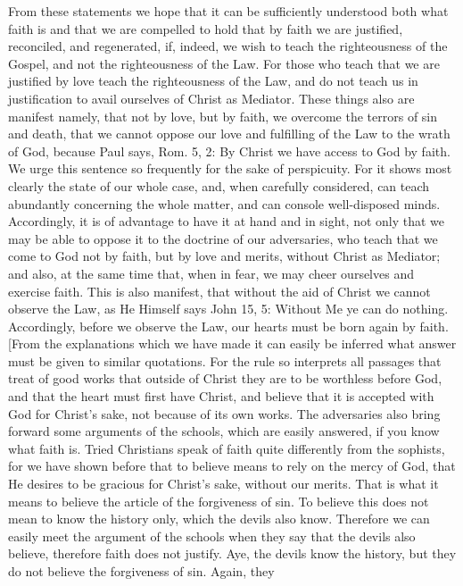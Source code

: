 From these statements we hope that it can be sufficiently understood
both what faith is and that we are compelled to hold that by faith we
are justified, reconciled, and regenerated, if, indeed, we wish to
teach the righteousness of the Gospel, and not the righteousness of
the Law.  For those who teach that we are justified by love teach the
righteousness of the Law, and do not teach us in justification to
avail ourselves of Christ as Mediator.  These things also are
manifest namely, that not by love, but by faith, we overcome the
terrors of sin and death, that we cannot oppose our love and
fulfilling of the Law to the wrath of God, because Paul says, Rom. 5,
2: By Christ we have access to God by faith.  We urge this sentence
so frequently for the sake of perspicuity.  For it shows most clearly
the state of our whole case, and, when carefully considered, can
teach abundantly concerning the whole matter, and can console
well-disposed minds.  Accordingly, it is of advantage to have it at
hand and in sight, not only that we may be able to oppose it to the
doctrine of our adversaries, who teach that we come to God not by
faith, but by love and merits, without Christ as Mediator; and also,
at the same time that, when in fear, we may cheer ourselves and
exercise faith.  This is also manifest, that without the aid of
Christ we cannot observe the Law, as He Himself says John 15, 5:
Without Me ye can do nothing.  Accordingly, before we observe the Law,
our hearts must be born again by faith.  [From the explanations
which we have made it can easily be inferred what answer must be
given to similar quotations.  For the rule so interprets all passages
that treat of good works that outside of Christ they are to be
worthless before God, and that the heart must first have Christ, and
believe that it is accepted with God for Christ's sake, not because
of its own works.  The adversaries also bring forward some arguments
of the schools, which are easily answered, if you know what faith is.
Tried Christians speak of faith quite differently from the sophists,
for we have shown before that to believe means to rely on the mercy
of God, that He desires to be gracious for Christ's sake, without our
merits.  That is what it means to believe the article of the
forgiveness of sin.  To believe this does not mean to know the
history only, which the devils also know.  Therefore we can easily
meet the argument of the schools when they say that the devils also
believe, therefore faith does not justify.  Aye, the devils know the
history, but they do not believe the forgiveness of sin.  Again, they

